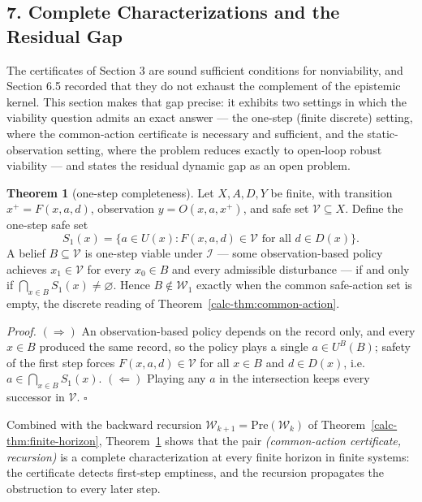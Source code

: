 \documentclass[10pt,twocolumn]{article}
\theoremstyle{definition}
\newtheorem{theorem}{Theorem}
\begin{document}
\subsection{7. Complete Characterizations and the Residual Gap}\label{calc-complete-characterizations}

The certificates of Section 3 are sound sufficient conditions for nonviability, and Section 6.5 recorded that they do not exhaust the complement of the epistemic kernel. This section makes that gap precise: it exhibits two settings in which the viability question admits an exact answer --- the one-step (finite discrete) setting, where the common-action certificate is necessary and sufficient, and the static-observation setting, where the problem reduces exactly to open-loop robust viability --- and states the residual dynamic gap as an open problem.

\begin{theorem}[one-step completeness]\label{calc-thm:onestep}
Let \(X, A, D, Y\) be finite, with transition \(x^{+} = F(x,a,d)\), observation \(y = O(x,a,x^{+})\), and safe set \(\mathcal{V} \subseteq X\). Define the one-step safe set
\[
S_{1}(x) = \bigl\{ a \in U(x) : F(x,a,d) \in \mathcal{V} \text{ for all } d \in D(x) \bigr\}.
\]
A belief \(B \subseteq \mathcal{V}\) is one-step viable under \(\mathcal{I}\) --- some observation-based policy achieves \(x_{1} \in \mathcal{V}\) for every \(x_{0} \in B\) and every admissible disturbance --- if and only if \(\bigcap_{x \in B} S_{1}(x) \neq \varnothing\). Hence \(B \notin \mathcal{W}_{1}\) exactly when the common safe-action set is empty, the discrete reading of Theorem~\ref{calc-thm:common-action}.
\end{theorem}

\emph{Proof.} \((\Rightarrow)\) An observation-based policy depends on the record only, and every \(x \in B\) produced the same record, so the policy plays a single \(a \in U^{B}(B)\); safety of the first step forces \(F(x,a,d) \in \mathcal{V}\) for all \(x \in B\) and \(d \in D(x)\), i.e.\ \(a \in \bigcap_{x \in B} S_{1}(x)\). \((\Leftarrow)\) Playing any \(a\) in the intersection keeps every successor in \(\mathcal{V}\). \hfill\(\square\)

Combined with the backward recursion \(\mathcal{W}_{k+1} = \mathrm{Pre}(\mathcal{W}_{k})\) of Theorem~\ref{calc-thm:finite-horizon}, Theorem~\ref{calc-thm:onestep} shows that the pair \emph{(common-action certificate, recursion)} is a complete characterization at every finite horizon in finite systems: the certificate detects first-step emptiness, and the recursion propagates the obstruction to every later step.
\end{document}
